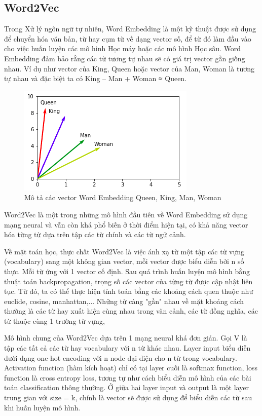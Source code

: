 \documentclass[12pt,a4paper,oneside]{book}
\begin{document}
			
	\subsection{Word2Vec}
	
	Trong Xử lý ngôn ngữ tự nhiên, Word Embedding là một kỹ thuật được sử dụng để chuyển hóa văn bản, từ hay cụm từ về dạng vector số, để từ đó làm đầu vào cho việc huấn luyện các mô hình Học máy hoặc các mô hình Học sâu. Word Embedding đảm bảo rằng các từ tương tự nhau sẽ có giá trị vector gần giống nhau. Ví dụ như vector của King, Queen hoặc vector của Man, Woman là tương tự nhau và đặc biệt ta có King – Man + Woman ≈ Queen.
	
	\begin{figure}[H]
		\begin{center}
			\includegraphics[width=0.8\columnwidth]{wordembedding}
		\end{center}
		\caption{Mô tả các vector Word Embedding Queen, King, Man, Woman}
	\end{figure}
	
	Word2Vec là một trong những mô hình đầu tiên về Word Embedding sử dụng mạng neural và vẫn còn khá phổ biến ở thời điểm hiện tại, có khả năng vector hóa từng từ dựa trên tập các từ chính và các từ ngữ cảnh.
	
	Về mặt toán học, thực chất Word2Vec là việc ánh xạ từ một tập các từ vựng (vocabulary) sang một không gian vector, mỗi vector được biểu diễn bởi n số thực. Mỗi từ ứng với 1 vector cố định. Sau quá trình huấn luyện mô hình bằng thuật toán backpropagation, trọng số các vector của từng từ được cập nhật liên tục. Từ đó, ta có thể thực hiện tính toán bằng các khoảng cách quen thuộc như euclide, cosine, manhattan,... Những từ càng "gần" nhau về mặt khoảng cách thường là các từ hay xuất hiện cùng nhau trong văn cảnh, các từ đồng nghĩa, các từ thuộc cùng 1 trường từ vựng,
	
	Mô hình chung của Word2Vec dựa trên 1 mạng neural khá đơn giản. Gọi V là tập các tất cả các từ hay vocabulary với n từ khác nhau. Layer input biểu diễn dưới dạng one-hot encoding với n node đại diện cho n từ trong vocabulary. Activation function (hàm kích hoạt) chỉ có tại layer cuối là softmax function, loss function là cross entropy loss, tương tự như cách biểu diễn mô hình của các bài toán classification thông thường. Ở giữa hai layer input và output là một layer trung gian với size = k, chính là vector sẽ được sử dụng để biểu diễn các từ sau khi huấn luyện mô hình.
	
\end{document}
